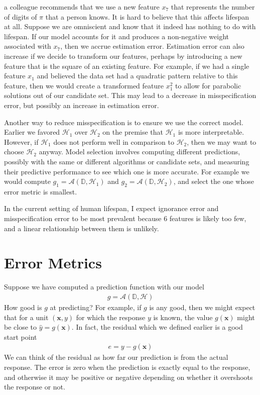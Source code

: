 \documentclass[12pt]{article}
\begin{document}
	a colleague recommends that we use a new feature $x_7$ that represents
	the number of digits of $\pi$ that a person knows. It is hard to believe that
	this affects lifespan at all. Suppose we are omniscient and know that it
	indeed has nothing to do with lifespan. If our model accounts for it
	and produces a non-negative weight associated with $x_7$, then we accrue
	estimation error. Estimation error can also increase if we decide to transform
	our features, perhaps by introducing a new feature that is the square
	of an existing feature. For example, if we had a single feature $x_1$
	and believed the data set had a quadratic pattern relative to this feature,
	then we would create a transformed feature $x_1^2$ to allow for parabolic
	solutions out of our candidate set. This may lead to a decrease in misspecification
	error, but possibly an increase in estimation error.
	
	Another way to reduce misspecification is to ensure we use the correct
	model. Earlier we favored $\mathcal{H}_1$ over $\mathcal{H}_2$ on
	the premise that $\mathcal{H}_1$ is more interpretable. However, if
	$\mathcal{H}_1$ does not perform well in comparison to $\mathcal{H}_2$,
	then we may want to choose $\mathcal{H}_2$ anyway. Model selection involves
	computing different predictions, possibly with the same or different
	algorithms or candidate sets, and measuring their predictive performance
	to see which one is more accurate. For example we would compute
	$g_1 = \mathcal{A}(\mathbb{D}, \mathcal{H}_1)$ and $g_2 = \mathcal{A}(\mathbb{D}, \mathcal{H}_2)$, and select the one whose error metric is smallest.
	
	In the current setting of human lifespan, I expect ignorance error and
	misspecification error to be most prevalent because $6$ features is likely
	too few, and a linear relationship between them is unlikely.
	\section{Error Metrics}
	Suppose we have computed a prediction function with our model
	\begin{align*}
		g = \mathcal{A}(\mathbb{D}, \mathcal{H})
	\end{align*}
	How good is $g$ at predicting? For example, if $g$ is any good,
	then we might expect that for a unit $(\bm{x}, y)$ for which
	the response $y$ is known,
	the value $g(\bm{x})$ might be close to $\hat{y}=g(\bm{x})$. In fact, the
	residual which we defined earlier is a good start point
	\begin{align*}
		e = y - g(\bm{x})
	\end{align*}
	We can think of the residual as how far our prediction is from the
	actual response. The error is zero when the prediction is exactly
	equal to the response, and otherwise it may be positive or negative
	depending on whether it overshoots the response or not.
	
\end{document}
